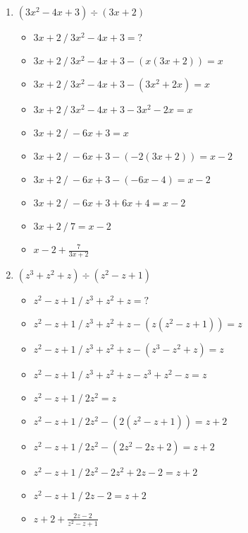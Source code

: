 \documentclass{article}
\begin{document}
\begin{onehalfspace}
\begin{enumerate}
    \item $(3x^{2} - 4x + 3) \div (3x + 2)$
    \begin{itemize}
        \item $3x + 2 \ / \ 3x^{2} - 4x + 3 = ?$
        \item $3x + 2 \ / \ 3x^{2} - 4x + 3 - (x(3x + 2)) = x$
        \item $3x + 2 \ / \ 3x^{2} - 4x + 3 - (3x^{2} + 2x) = x$
        \item $3x + 2 \ / \ 3x^{2} - 4x + 3 - 3x^{2} - 2x = x$
        \item $3x + 2 \ / \  -6x + 3 = x$
        \item $3x + 2 \ / \  -6x + 3 - (-2(3x + 2)) = x - 2$
        \item $3x + 2 \ / \  -6x + 3 - (-6x - 4) = x - 2$
        \item $3x + 2 \ / \  -6x + 3 + 6x + 4 = x - 2$
        \item $3x + 2 \ / \  7 = x - 2$
        \item $x - 2 + \frac{7}{3x + 2}$
    \end{itemize}

    \item $(z^{3}+ z^{2} + z) \div (z^{2} - z + 1)$
    \begin{itemize}
        \item $z^{2} - z + 1 \ / \ z^{3}+ z^{2} + z = ?$
        \item $z^{2} - z + 1 \ / \ z^{3}+ z^{2} + z - (z(z^{2} - z + 1)) = z$
        \item $z^{2} - z + 1 \ / \ z^{3}+ z^{2} + z - (z^{3} - z^{2} + z) = z$
        \item $z^{2} - z + 1 \ / \ z^{3}+ z^{2} + z - z^{3} + z^{2} - z = z$
        \item $z^{2} - z + 1 \ / \ 2z^{2} = z$
        \item $z^{2} - z + 1 \ / \ 2z^{2} -  (2(z^{2} - z + 1)) = z + 2$
        \item $z^{2} - z + 1 \ / \ 2z^{2} -  (2z^{2} - 2z + 2) = z + 2$
        \item $z^{2} - z + 1 \ / \ 2z^{2} - 2z^{2} + 2z - 2 = z + 2$
        \item $z^{2} - z + 1 \ / \ 2z - 2 = z + 2$
        \item $z + 2 + \frac{2z - 2}{z^{2} - z + 1}$
    \end{itemize}
\end{enumerate}
\end{onehalfspace}
\end{document}
